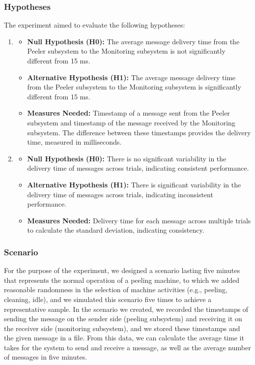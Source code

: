\documentclass[conference]{IEEEtran}
\begin{document}
\subsubsection{Hypotheses}
The experiment aimed to evaluate the following hypotheses:
\begin{enumerate}
    \item 
        \begin{itemize}
            \item \textbf{Null Hypothesis (H0):} The average message delivery time from the Peeler subsystem to the Monitoring subsystem is not significantly different from 15 ms.
            \item \textbf{Alternative Hypothesis (H1):} The average message delivery time from the Peeler subsystem to the Monitoring subsystem is significantly different from 15 ms.
            \item \textbf{Measures Needed:} Timestamp of a message sent from the Peeler subsystem and timestamp of the message received by the Monitoring subsystem. The difference between these timestamps provides the delivery time, measured in milliseconds.
        \end{itemize}
    \item 
        \begin{itemize}
            \item \textbf{Null Hypothesis (H0):} There is no significant variability in the delivery time of messages across trials, indicating consistent performance.
            \item \textbf{Alternative Hypothesis (H1):} There is significant variability in the delivery time of messages across trials, indicating inconsistent performance.
            \item \textbf{Measures Needed:} Delivery time for each message across multiple trials to calculate the standard deviation, indicating consistency.
        \end{itemize}
\end{enumerate}

\subsubsection{Scenario}
For the purpose of the experiment, we designed a scenario lasting five minutes that represents the normal operation of a peeling machine, to which we added reasonable randomness in the selection of machine activities (e.g., peeling, cleaning, idle), and we simulated this scenario five times to achieve a representative sample. In the scenario we created, we recorded the timestamps of sending the message on the sender side (peeling subsystem) and receiving it on the receiver side (monitoring subsystem), and we stored these timestamps and the given message in a file. From this data, we can calculate the average time it takes for the system to send and receive a message, as well as the average number of messages in five minutes.
\end{document}
